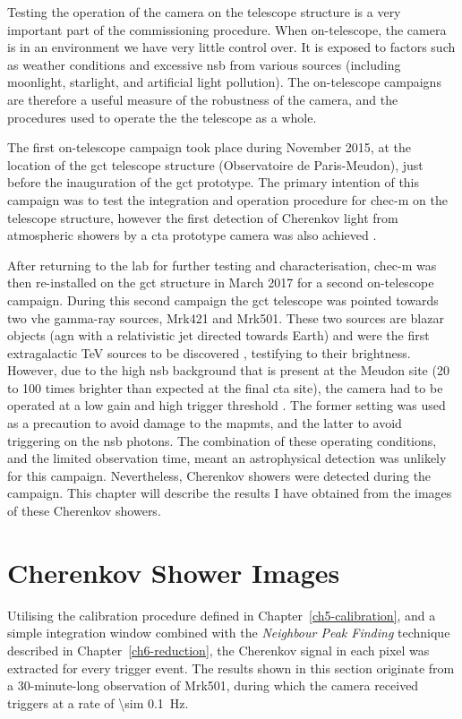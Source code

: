 Testing the operation of the camera on the telescope structure is a very important part of the commissioning procedure. When on-telescope, the camera is in an environment we have very little control over. It is exposed to factors such as weather conditions and excessive \gls{nsb} from various sources (including moonlight, starlight, and artificial light pollution). The on-telescope campaigns are therefore a useful measure of the robustness of the camera, and the procedures used to operate the the telescope as a whole.

The first on-telescope campaign took place during November 2015, at the location of the \gls{gct} telescope structure (Observatoire de Paris-Meudon), just before the inauguration of the \gls{gct} prototype. The primary intention of this campaign was to test the integration and operation procedure for \gls{chec-m} on the telescope structure, however the first detection of Cherenkov light from atmospheric showers by a \gls{cta} prototype camera was also achieved \cite{Watson2017}. 

After returning to the lab for further testing and characterisation, \gls{chec-m} was then re-installed on the \gls{gct} structure in March 2017 for a second on-telescope campaign. During this second campaign the \gls{gct} telescope was pointed towards two \gls{vhe} gamma-ray sources, Mrk421 and Mrk501. These two sources are blazar objects (\gls{agn} with a relativistic jet directed towards Earth) and were the first extragalactic \si{TeV} sources to be discovered \cite{Punch1992, Quinn1996}, testifying to their brightness. However, due to the high \gls{nsb} background that is present at the Meudon site (20 to 100 times brighter than expected at the final \gls{cta} site), the camera had to be operated at a low gain and high trigger threshold \cite{Zorn2017}. The former setting was used as a precaution to avoid damage to the \glspl{mapmt}, and the latter to avoid triggering on the \gls{nsb} photons. The combination of these operating conditions, and the limited observation time, meant an astrophysical detection was unlikely for this campaign. Nevertheless, Cherenkov showers were detected during the campaign. This chapter will describe the results I have obtained from the images of these Cherenkov showers.

\section{Cherenkov Shower Images}

Utilising the calibration procedure defined in Chapter~\ref{ch5-calibration}, and a simple integration window combined with the \textit{Neighbour Peak Finding} technique described in Chapter~\ref{ch6-reduction}, the Cherenkov signal in each pixel was extracted for every trigger event. The results shown in this section originate from a 30-minute-long observation of Mrk501, during which the camera received triggers at a rate of \SI{\sim 0.1}{Hz}.

